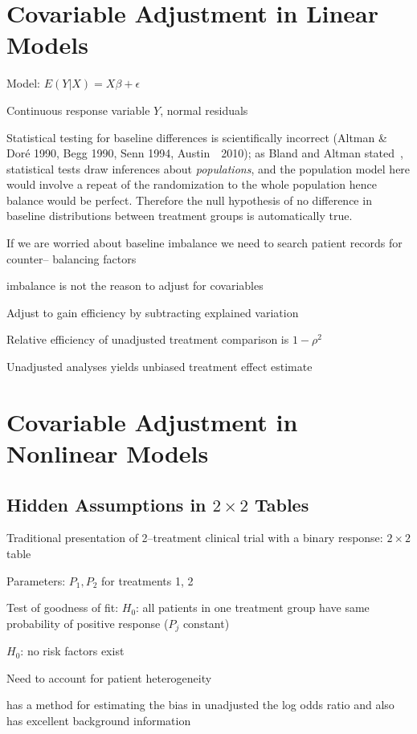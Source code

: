 \section{Covariable Adjustment in Linear
  Models} 
\bi
\item   Model: $E(Y | X) = X \beta + \epsilon$
\item   Continuous response variable $Y$, normal residuals
\item   Statistical testing for baseline differences is scientifically
        incorrect (Altman \& Dor\'{e} 1990, Begg 1990, Senn 1994,
        Austin~\etal\ 2010); as Bland and Altman
        stated~\cite{bla11com}, statistical tests draw inferences
        about \emph{populations}, and the population model here would
        involve a repeat of the randomization to the whole population
        hence balance would be perfect.  Therefore the null hypothesis of no
        difference in baseline distributions between treatment groups
        is automatically true.
\item   If we are worried about baseline imbalance we need to search
        patient records for counter-- balancing factors
\item   \ra imbalance is not the reason to adjust for covariables
\item   Adjust to gain efficiency by subtracting explained variation
\item   Relative efficiency of unadjusted treatment comparison is $1-\rho^2$
\item   Unadjusted analyses yields unbiased treatment effect estimate
\ei

\section{Covariable Adjustment in Nonlinear Models}
\subsection{Hidden Assumptions in $2 \times 2$ Tables}
\bi
\item   Traditional presentation of 2--treatment clinical trial with a
        binary response: $2 \times 2$ table
\item   Parameters: $P_{1}, P_{2}$ for treatments 1, 2
\item   Test of goodness of fit: $H_0$: all patients in one treatment
        group have same probability of positive response ($P_j$ constant)
\item   \ra $H_0$: no risk factors exist
\item   Need to account for patient heterogeneity
\item   \cite{mat15inc} has a method for estimating the bias in
  unadjusted the log odds ratio and also has excellent background information
\ei

